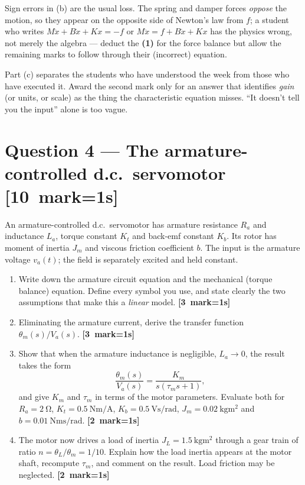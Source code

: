 \documentclass[11pt,a4paper]{article}
\newcommand{\qmarks}[1]{\hfill\mbox{\small\color{fnavy}\textbf{[#1 mark\ifnum#1=1\else s\fi]}}}
\newcommand{\mk}[1]{{\small\color{faccent}\textbf{(#1)}}}
\begin{document}
\begin{markernotes}
Sign errors in (b) are the usual loss. The spring and damper forces
\emph{oppose} the motion, so they appear on the opposite side of Newton's law
from $f$; a student who writes $M\ddot x+B\dot x+Kx=-f$ or
$M\ddot x=f+B\dot x+Kx$ has the physics wrong, not merely the algebra ---
deduct the \mk{1} for the force balance but allow the remaining marks to follow
through their (incorrect) equation.

Part (c) separates the students who have understood the week from those who
have executed it. Award the second mark only for an answer that identifies
\emph{gain} (or units, or scale) as the thing the characteristic equation
misses. ``It doesn't tell you the input'' alone is too vague.
\end{markernotes}

\section*{Question 4 --- The armature-controlled d.c.\ servomotor \qmarks{10}}

An armature-controlled d.c.\ servomotor has armature resistance $R_{a}$ and
inductance $L_{a}$, torque constant $K_{t}$ and back-emf constant $K_{b}$. Its
rotor has moment of inertia $J_{m}$ and viscous friction coefficient $b$. The
input is the armature voltage $v_{a}(t)$; the field is separately excited and
held constant.

\begin{enumerate}[label=(\alph*)]
\item Write down the armature circuit equation and the mechanical (torque
      balance) equation. Define every symbol you use, and state clearly the two
      assumptions that make this a \emph{linear} model. \qmarks{3}

\item Eliminating the armature current, derive the transfer function
      $\theta_{m}(s)/V_{a}(s)$. \qmarks{3}

\item Show that when the armature inductance is negligible, $L_{a}\to 0$, the
      result takes the form
      \[
        \frac{\theta_{m}(s)}{V_{a}(s)}=\frac{K_{m}}{s(\tau_{m}s+1)},
      \]
      and give $K_{m}$ and $\tau_{m}$ in terms of the motor parameters.
      Evaluate both for $R_{a}=\SI{2}{\ohm}$,
      $K_{t}=\SI{0.5}{\newton\metre\per\ampere}$,
      $K_{b}=\SI{0.5}{\volt\second\per\radian}$,
      $J_{m}=\SI{0.02}{\kilogram\metre\squared}$ and
      $b=\SI{0.01}{\newton\metre\second\per\radian}$. \qmarks{2}

\item The motor now drives a load of inertia
      $J_{L}=\SI{1.5}{\kilogram\metre\squared}$ through a gear train of ratio
      $n=\theta_{L}/\theta_{m}=1/10$. Explain how the load inertia appears at
      the motor shaft, recompute $\tau_{m}$, and comment on the result. Load
      friction may be neglected. \qmarks{2}
\end{enumerate}
\end{document}
